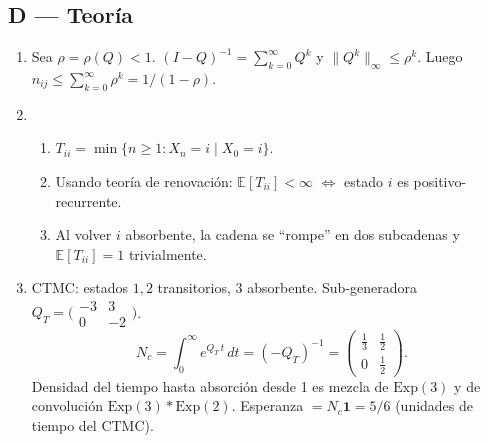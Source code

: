 \documentclass[11pt,spanish]{article}
\newcommand{\E}{\mathbb{E}}
\begin{document}
\subsection*{D — Teoría}
\begin{enumerate}[label=\textbf{D.\arabic*}]
  \item Sea \(\rho=\rho(Q)<1\).  
        \((I-Q)^{-1}=\sum_{k=0}^{\infty}Q^{k}\)  
        y \(\lVert Q^{k}\rVert_\infty\le\rho^{k}\).  
        Luego \(n_{ij}\le\sum_{k=0}^{\infty}\rho^{k}=1/(1-\rho)\).

  \item
        \begin{enumerate}[label=\alph*)]
          \item \(T_{ii}=\min\{n\ge1:X_n=i\mid X_0=i\}\).  
          \item Usando teoría de renovación: \(\E[T_{ii}]<\infty\) \(\Leftrightarrow\) estado \(i\) es positivo-recurrente.  
          \item Al volver \(i\) absorbente, la cadena se “rompe” en dos
                subcadenas y \(\E[T_{ii}]=1\) trivialmente.
        \end{enumerate}

  \item CTMC: estados \(1,2\) transitorios, \(3\) absorbente.  
        Sub-generadora \(Q_T=\bigl(\begin{smallmatrix}-3&3\\0&-2\end{smallmatrix}\bigr)\).  
        \[
          N_c = \int_{0}^{\infty} e^{Q_T\,t}\,dt = (-Q_T)^{-1}
              =\begin{pmatrix}\frac13 & \frac12\\ 0 & \frac12\end{pmatrix}.
        \]
        Densidad del tiempo hasta absorción desde 1 es mezcla de
        \(\text{Exp}(3)\) y de convolución \(\text{Exp}(3)*\text{Exp}(2)\).  
        Esperanza \(= N_c\bm1 = 5/6\) (unidades de tiempo del CTMC).
\end{enumerate}

\newpage
\end{document}
